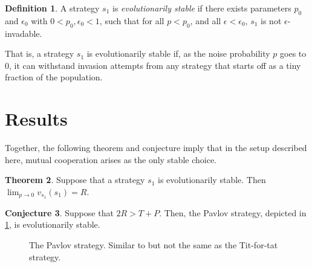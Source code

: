 \documentclass[12pt]{article}
\theoremstyle{definition}
\newtheorem{theorem}{Theorem}[section]
\newtheorem{definition}[theorem]{Definition}
\newtheorem{conjecture}[theorem]{Conjecture}
\theoremstyle{remark}
\begin{document}
\begin{definition}
  \label{definitionevolutionarystability}
  A strategy $s_1$ is \textit{evolutionarily stable} if there exists parameters $p_0$ and $\epsilon_0$ with $0 < p_0, \epsilon_0 < 1$, such that for all $p < p_0$, and all $\epsilon < \epsilon_0$, $s_1$ is not $\epsilon$-invadable.
\end{definition}

That is, a strategy $s_1$ is evolutionarily stable if, as the noise probability $p$ goes to 0, it can withstand invasion attempts from any strategy that starts off as a tiny fraction of the population.






\section{Results}
\label{sectionresults}

Together, the following theorem and conjecture imply that in the setup described here, mutual cooperation arises as the only stable choice.

\begin{theorem}
  \label{evolutionarystable1}
  Suppose that a strategy $s_1$ is evolutionarily stable. Then $\lim_{p \to 0} v_{s_1}(s_1) = R$.
\end{theorem}

\begin{conjecture}
  \label{pavlovtheorem}
  Suppose that $2R > T + P$. Then, the Pavlov strategy, depicted in \cref{pavlovfigure}, is evolutionarily stable.
\end{conjecture}

\begin{figure}
  \centering
  \caption{The Pavlov strategy. Similar to but not the same as the Tit-for-tat strategy.}
  \label{pavlovfigure}
\end{figure}
\end{document}
